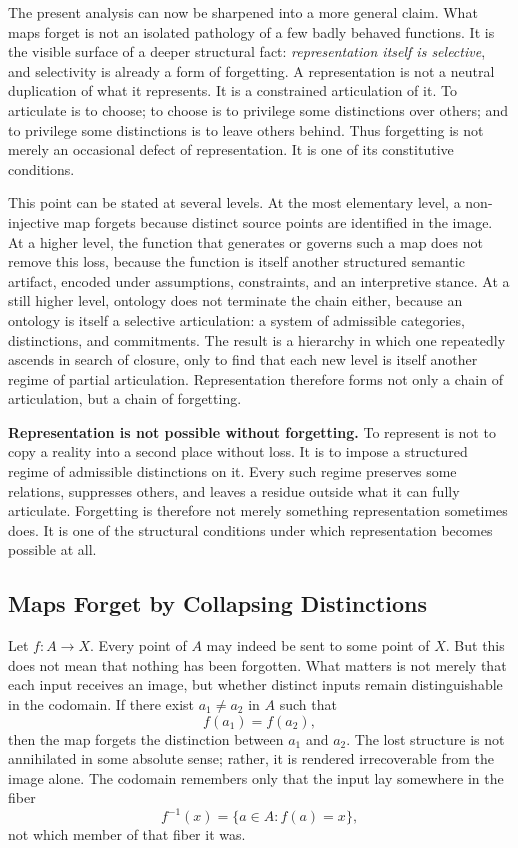 \documentclass[11pt,a4paper]{article}
\newenvironment{keybox}[1]{%
  \Needspace*{8\baselineskip}%
  \begin{tcolorbox}[
    enhanced,
    breakable=false,
    colback=blue!5,
    colframe=blue!45!black,
    coltitle=black,
    colbacktitle=blue!14,
    boxrule=0.85pt,
    arc=2.5pt,
    left=9pt, right=9pt, top=6pt, bottom=6pt,
    titlerule=0.55pt,
    fonttitle=\bfseries,
    title={#1},
    before upper=\raggedright,
    before skip=0.9\baselineskip,
    after skip=0.9\baselineskip
  ]%
}{%
  \end{tcolorbox}%
}
\theoremstyle{plain}
\theoremstyle{definition}
\theoremstyle{remark}
\begin{document}
The present analysis can now be sharpened into a more general claim. What maps forget is not an isolated pathology of a few badly behaved functions. It is the visible surface of a deeper structural fact: \emph{representation itself is selective}, and selectivity is already a form of forgetting. A representation is not a neutral duplication of what it represents. It is a constrained articulation of it. To articulate is to choose; to choose is to privilege some distinctions over others; and to privilege some distinctions is to leave others behind. Thus forgetting is not merely an occasional defect of representation. It is one of its constitutive conditions.

This point can be stated at several levels. At the most elementary level, a non-injective map forgets because distinct source points are identified in the image. At a higher level, the function that generates or governs such a map does not remove this loss, because the function is itself another structured semantic artifact, encoded under assumptions, constraints, and an interpretive stance. At a still higher level, ontology does not terminate the chain either, because an ontology is itself a selective articulation: a system of admissible categories, distinctions, and commitments. The result is a hierarchy in which one repeatedly ascends in search of closure, only to find that each new level is itself another regime of partial articulation. Representation therefore forms not only a chain of articulation, but a chain of forgetting.

\begin{keybox}{Representation is not possible without forgetting}
\textbf{Representation is not possible without forgetting.} To represent is not to copy a reality into a second place without loss. It is to impose a structured regime of admissible distinctions on it. Every such regime preserves some relations, suppresses others, and leaves a residue outside what it can fully articulate. Forgetting is therefore not merely something representation sometimes does. It is one of the structural conditions under which representation becomes possible at all.
\end{keybox}

\subsection{Maps Forget by Collapsing Distinctions}

Let \(f : A \to X\). Every point of \(A\) may indeed be sent to some point of \(X\). But this does not mean that nothing has been forgotten. What matters is not merely that each input receives an image, but whether distinct inputs remain distinguishable in the codomain. If there exist \(a_1 \neq a_2\) in \(A\) such that
\[
f(a_1)=f(a_2),
\]
then the map forgets the distinction between \(a_1\) and \(a_2\). The lost structure is not annihilated in some absolute sense; rather, it is rendered irrecoverable from the image alone. The codomain remembers only that the input lay somewhere in the fiber
\[
f^{-1}(x)=\{a\in A : f(a)=x\},
\]
not which member of that fiber it was.
\end{document}
